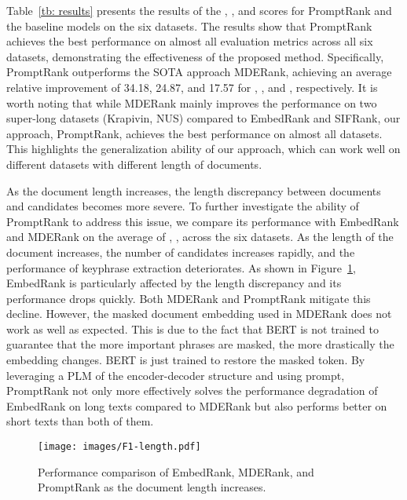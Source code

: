 \documentclass[11pt]{article}
\begin{document}
 
Table~\ref{tb: results} presents the results of the , , and  scores for PromptRank and the baseline models on the six datasets. The results show that PromptRank achieves the best performance on almost all evaluation metrics across all six datasets, demonstrating the effectiveness of the proposed method. Specifically, PromptRank outperforms the SOTA approach MDERank, achieving an average relative improvement of 34.18, 24.87, and 17.57 for , , and , respectively. It is worth noting that while MDERank mainly improves the performance on two super-long datasets (Krapivin, NUS) compared to EmbedRank and SIFRank, our approach, PromptRank, achieves the best performance on almost all datasets. This highlights the generalization ability of our approach, which can work well on different datasets with different length of documents. 



As the document length increases, the length discrepancy between documents and candidates becomes more severe. To further investigate the ability of PromptRank to address this issue, we compare its performance with EmbedRank and MDERank on the average of , ,  across the six datasets. As the length of the document increases, the number of candidates increases rapidly, and the performance of keyphrase extraction deteriorates. As shown in Figure~\ref{fg: comparison}, EmbedRank is particularly affected by the length discrepancy and its performance drops quickly. Both MDERank and PromptRank mitigate this decline. However, the masked document embedding used in MDERank does not work as well as expected. This is due to the fact that BERT is not trained to guarantee that the more important phrases are masked, the more drastically the embedding changes. BERT is just trained to restore the masked token. By leveraging a PLM of the encoder-decoder structure and using prompt, PromptRank not only more effectively solves the performance degradation of EmbedRank on long texts compared to MDERank but also performs better on short texts than both of them.




\begin{figure}[!t]
\centerline{\texttt{[image: images/F1-length.pdf]}}
\caption{Performance comparison of EmbedRank, MDERank, and PromptRank as the document length increases. } 
\label{fg: comparison}
\end{figure}
\end{document}
